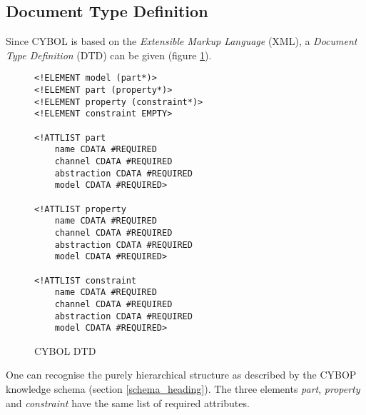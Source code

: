 %
%
%
%
%
%
%

\subsection{Document Type Definition}
\label{document_type_definition_heading}

Since CYBOL is based on the \emph{Extensible Markup Language} (XML), a
\emph{Document Type Definition} (DTD) can be given (figure \ref{dtd_figure}).

\begin{figure}[ht]
    \bigskip
    \begin{scriptsize}
        \begin{verbatim}
<!ELEMENT model (part*)>
<!ELEMENT part (property*)>
<!ELEMENT property (constraint*)>
<!ELEMENT constraint EMPTY>

<!ATTLIST part
    name CDATA #REQUIRED
    channel CDATA #REQUIRED
    abstraction CDATA #REQUIRED
    model CDATA #REQUIRED>

<!ATTLIST property
    name CDATA #REQUIRED
    channel CDATA #REQUIRED
    abstraction CDATA #REQUIRED
    model CDATA #REQUIRED>

<!ATTLIST constraint
    name CDATA #REQUIRED
    channel CDATA #REQUIRED
    abstraction CDATA #REQUIRED
    model CDATA #REQUIRED>
        \end{verbatim}
        \caption{CYBOL DTD}
        \label{dtd_figure}
    \end{scriptsize}
\end{figure}

One can recognise the purely hierarchical structure as described by the CYBOP
knowledge schema (section \ref{schema_heading}). The three elements
\emph{part}, \emph{property} and \emph{constraint} have the same list of
required attributes.
